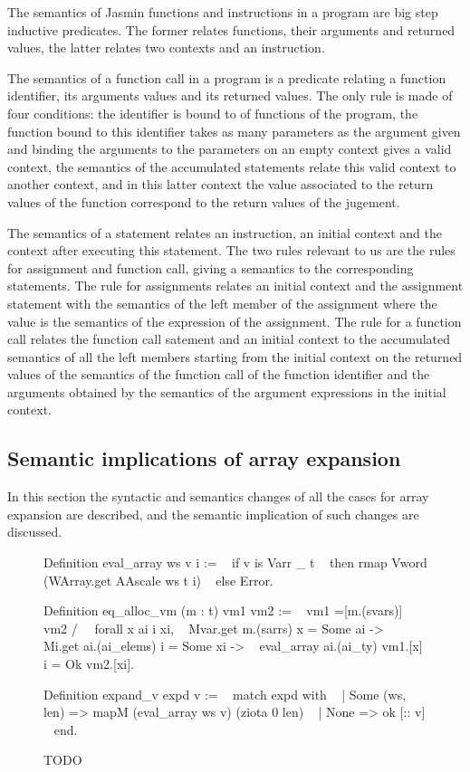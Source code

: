 \documentclass{article}
\begin{document}
The semantics of Jasmin functions and instructions in a program are big step
inductive predicates. The former relates functions, their arguments and returned
values, the latter relates two contexts and an instruction.

The semantics of a function call in a program is a predicate relating a function
identifier, its arguments values and its returned values. The only rule is made
of four conditions: the identifier is bound to of functions of the program, the
function bound to this identifier takes as many parameters as the argument given
and binding the arguments to the parameters on an empty context gives a valid
context, the semantics of the accumulated statements relate this valid context
to another context, and in this latter context the value associated to the
return values of the function correspond to the return values of the jugement.

\smallskip

The semantics of a statement relates an instruction, an initial context and the
context after executing this statement. The two rules relevant to us are the
rules for assignment and function call, giving a semantics to the corresponding
statements. The rule for assignments relates an initial context and the assignment
statement with the semantics of the left member of the assignment where the
value is the semantics of the expression of the assignment. The rule for a
function call relates the function call satement and an initial context to the
accumulated semantics of all the left members starting from the initial context
on the returned values of the semantics of the function call of the function
identifier and the arguments obtained by the semantics of the argument
expressions in the initial context.


\subsection{Semantic implications of array expansion}

In this section the syntactic and semantics changes of all the cases for array
expansion are described, and the semantic implication of such changes are
discussed.

\begin{figure}
\obeylines\obeyspaces\ttfamily%
Definition eval\_array ws v i :=
~ if v is Varr \_ t
~ then rmap Vword (WArray.get AAscale ws t i)
~ else Error.

Definition eq\_alloc\_vm (m : t) vm1 vm2 :=
~ vm1 =[m.(svars)] vm2 /\
~ forall x ai i xi,
~   Mvar.get m.(sarrs) x = Some ai ->
~   Mi.get ai.(ai\_elems) i = Some xi ->
~   eval\_array ai.(ai\_ty) vm1.[x] i = Ok vm2.[xi].

Definition expand\_v expd v :=
~ match expd with
~ | Some (ws, len) => mapM (eval\_array ws v) (ziota 0 len)
~ | None => ok [:: v]
~ end.
\normalfont%
\caption{TODO}
\end{figure}
\end{document}
